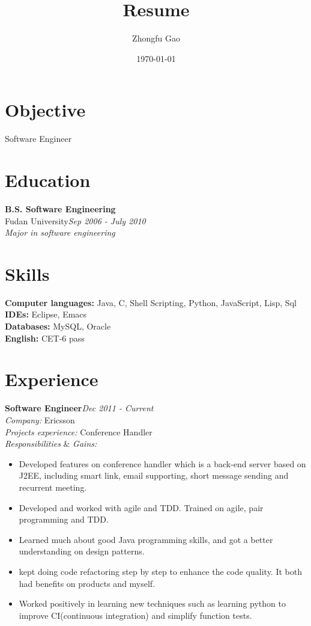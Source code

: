 \documentclass[line, margin, 11pt]{res}
\author{Zhongfu Gao}
\title{Resume}
\date{\today}
\begin{document}
\renewcommand{\namefont}{ \LARGE \bf } %
\address{{\bf Email: }joshuafufu@gmail.com}
\address{{\bf Mobile: }(+86)15921928229}

\begin{resume}

\section{Objective}
Software Engineer

\section{Education}
{\bf B.S. Software Engineering}\\
Fudan University\hfill {\it Sep 2006 - July 2010}\\
{\sl Major in software engineering}

\section{Skills}
{\bf Computer languages:} Java, C, Shell Scripting, Python, JavaScript, Lisp, Sql\\
{\bf IDEs:} Eclipse, Emacs\\
{\bf Databases:} MySQL, Oracle\\
{\bf English:} CET-6 pass


\section{Experience}

{\bf Software Engineer}\hfill {\it Dec 2011 - Current}\\
{\sl Company:} Ericsson\\
{\sl Projects experience:} Conference Handler\\
{\sl Responsibilities} \& {\sl Gains:}
\begin{itemize}
\item Developed features on conference handler which is a back-end server based on J2EE, including smart link, email supporting, short message sending and recurrent meeting.
\item Developed and worked with agile and TDD. Trained on agile, pair programming and TDD.
\item Learned much about good Java programming skills, and got a better understanding on design patterns.
\item kept doing code refactoring step by step to enhance the code quality. It both had benefits on products and myself.
\item Worked positively in learning new techniques such as learning python to improve CI(continuous integration) and simplify function tests.
\end{itemize}


\end{resume}
\end{document}

